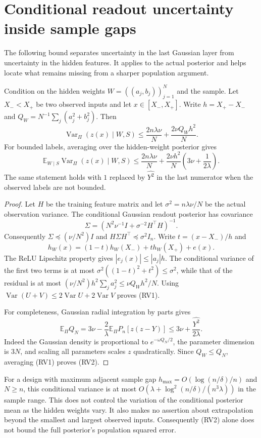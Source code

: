 \section{Conditional readout uncertainty inside sample gaps}
The following bound separates uncertainty in the last Gaussian layer
from uncertainty in the hidden features. It applies to the actual
posterior and helps locate what remains missing from a sharper
population argument.

\begin{proposition}
Condition on the hidden weights $W=((a_j,b_j))_{j=1}^N$ and the sample.
Let $X_-<X_+$ be two observed inputs and let $x\in[X_-,X_+]$.
Write $h=X_+-X_-$ and
$Q_W=N^{-1}\sum_j(a_j^2+b_j^2)$.
Then
\[
 \operatorname{Var}_{\Pi}(z(x)\mid W,S)
 \le \frac{2n\lambda\nu}{N}+
       \frac{2\nu Q_Wh^2}{N}. \tag{RV1}
\]
For bounded labels, averaging over the hidden-weight posterior gives
\[
 \mathbb E_{W\mid S}\operatorname{Var}_{\Pi}(z(x)\mid W,S)
 \le\frac{2n\lambda\nu}{N}
 +\frac{2\nu h^2}{N}\left(3\nu+\frac1{2\lambda}\right). \tag{RV2}
\]
The same statement holds with $1$ replaced by $\widehat{Y^2}$ in
the last numerator when the observed labels are not bounded.
\end{proposition}
\begin{proof}
Let $H$ be the training feature matrix and let
$\sigma^2=n\lambda\nu/N$ be the actual observation variance.
The conditional Gaussian readout posterior has covariance
\[
 \Sigma=(N^2\nu^{-1}I+\sigma^{-2}H^\top H)^{-1}.
\]
Consequently $\Sigma\preceq(\nu/N^2)I$ and
$H\Sigma H^\top\preceq\sigma^2 I_n$.
Write $t=(x-X_-)/h$ and
\[
 h_W(x)=(1-t)h_W(X_-)+t h_W(X_+)+e(x).
\]
The ReLU Lipschitz property gives
$|e_j(x)|\le |a_j|h$.
The conditional variance of the first two terms is at most
$\sigma^2((1-t)^2+t^2)\le\sigma^2$, while that of the residual
is at most $(\nu/N^2)h^2\sum_j a_j^2\le\nu Q_Wh^2/N$.
Using $\operatorname{Var}(U+V)\le2\operatorname{Var}U+
2\operatorname{Var}V$ proves (RV1).

For completeness, Gaussian radial integration by parts gives
\[
 \mathbb E_\Pi Q_N
 =3\nu-\frac2\lambda\mathbb E_\Pi P_n[z(z-Y)]
 \le3\nu+\frac{\widehat{Y^2}}{2\lambda}.
\]
Indeed the Gaussian density is proportional to
$e^{-\omega Q_N/2}$, the parameter dimension is $3N$, and scaling
all parameters scales $z$ quadratically. Since $Q_W\le Q_N$,
averaging (RV1) proves (RV2).
\end{proof}

For a design with maximum adjacent sample gap
$h_{\max}=O(\log(n/\delta)/n)$ and $N\ge n$, this conditional
variance is at most
$O(\lambda+\log^2(n/\delta)/(n^3\lambda))$ in the sample range.
This does not control the variation of the conditional posterior
mean as the hidden weights vary. It also makes no assertion about
extrapolation beyond the smallest and largest observed inputs.
Consequently (RV2) alone does not bound the full posterior's
population squared error.
